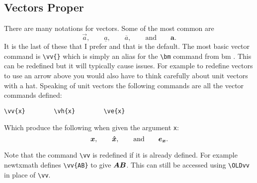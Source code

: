 \documentclass[fleqn, a4paper, openany]{memoir}
\newcommand{\package}[1]{{\textsf{\footnotesize #1}}}  %
\begin{document}
    \subsection{Vectors Proper}
    There are many notations for vectors.
    Some of the most common are
    \begin{equation}
        \vec{a}, \qquad \underline{a}, \qquad \overline{a}, \qquad\text{and}\qquad \bm{a}.
    \end{equation}
    It is the last of these that I prefer and that is the default.
    The most basic vector command is \verb*|\vv{}| which is simply an alias for the \verb*|\bm| command from \package{bm} \cite{bm}.
    This can be redefined but it will typically cause issues.
    For example to redefine vectors to use an arrow above you would also have to think carefully about unit vectors with a hat.
    Speaking of unit vectors the following commands are all the vector commands defined:
    \begin{Verbatim}[gobble=2]
        \vv{x}        \vh{x}        \ve{x}
    \end{Verbatim}
    Which produce the following when given the argument \verb*|x|:
    \begin{equation}
        \bm{x}, \qquad \bm{\hat{x}}, \qquad\text{and}\qquad \bm{e_{x}}.
    \end{equation}
    
    Note that the command \verb*|\vv| is redefined if it is already defined.
    For example \package{newtxmath} \cite{newtx} defines \verb*|\vv{AB}| to give \(\OLDvv{AB}\).
    This can still be accessed using \verb*|\OLDvv| in place of \verb*|\vv|.
    
\end{document}
